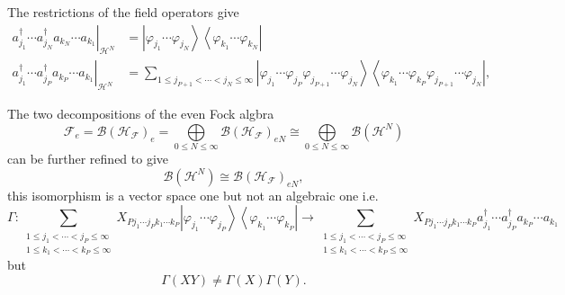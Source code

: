 \documentclass[aps,preprint]{revtex4}%
\begin{document}
The restrictions of the field operators give
\begin{align}
\left.  a_{j_{1}}^{\dagger}\cdots a_{j_{N}}^{\dagger}a_{k_{N}}\cdots a_{k_{1}%
}\right\vert _{\mathcal{H}^{N}}  &  =\left\vert \varphi_{j_{1}}\cdots
\varphi_{j_{N}}\right\rangle \left\langle \varphi_{k_{1}}\cdots\varphi_{k_{N}%
}\right\vert \\
\left.  a_{j_{1}}^{\dagger}\cdots a_{j_{P}}^{\dagger}a_{k_{P}}\cdots a_{k_{1}%
}\right\vert _{\mathcal{H}^{N}}  &  =\sum_{1\leq j_{P+1}<\cdots<j_{N}%
\leq\infty}\left\vert \varphi_{j_{1}}\cdots\varphi_{j_{P}}\varphi_{j_{P+1}%
}\cdots\varphi_{j_{N}}\right\rangle \left\langle \varphi_{k_{1}}\cdots
\varphi_{k_{P}}\varphi_{j_{P+1}}\cdots\varphi_{j_{N}}\right\vert ,
\end{align}


The two decompositions of the even Fock algbra%
\begin{equation}
\mathcal{F}_{e}=\mathcal{B}\left(  \mathcal{H}_{\mathcal{F}}\right)  _{e}=%
{\displaystyle\bigoplus\limits_{0\leq N\leq\infty}}
\mathcal{B}\left(  \mathcal{H}_{\mathcal{F}}\right)  _{eN}\cong%
{\displaystyle\bigoplus\limits_{0\leq N\leq\infty}}
\mathcal{B}\left(  \mathcal{H}^{N}\right)
\end{equation}
can be further refined to give
\begin{equation}
\mathcal{B}\left(  \mathcal{H}^{N}\right)  \cong\mathcal{B}\left(
\mathcal{H}_{\mathcal{F}}\right)  _{eN},
\end{equation}
this isomorphism is a vector space one but not an algebraic one i.e.%
\begin{equation}
\Gamma:\sum_{\substack{1\leq j_{1}<\cdots<j_{P}\leq\infty\\1\leq k_{1}%
<\cdots<k_{P}\leq\infty}}X_{Pj_{1}\cdots j_{P}k_{1}\cdots k_{P}}\left\vert
\varphi_{j_{1}}\cdots\varphi_{j_{P}}\right\rangle \left\langle \varphi_{k_{1}%
}\cdots\varphi_{k_{P}}\right\vert \longrightarrow\sum_{\substack{1\leq
j_{1}<\cdots<j_{P}\leq\infty\\1\leq k_{1}<\cdots<k_{P}\leq\infty}%
}X_{Pj_{1}\cdots j_{P}k_{1}\cdots k_{P}}a_{j_{1}}^{\dagger}\cdots a_{j_{P}%
}^{\dagger}a_{k_{P}}\cdots a_{k_{1}}%
\end{equation}
but
\begin{equation}
\Gamma(XY)\neq\Gamma(X)\Gamma(Y).
\end{equation}
\end{document}
